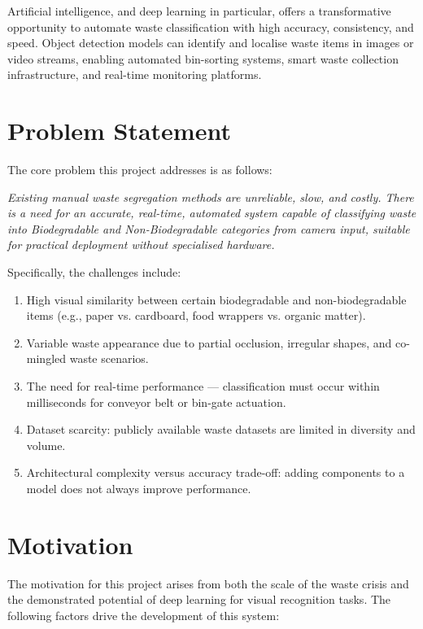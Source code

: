 Artificial intelligence, and deep learning in particular, offers a transformative opportunity to automate waste classification with high accuracy, consistency, and speed. Object detection models can identify and localise waste items in images or video streams, enabling automated bin-sorting systems, smart waste collection infrastructure, and real-time monitoring platforms.

\section{Problem Statement}

The core problem this project addresses is as follows:

\textit{Existing manual waste segregation methods are unreliable, slow, and costly. There is a need for an accurate, real-time, automated system capable of classifying waste into Biodegradable and Non-Biodegradable categories from camera input, suitable for practical deployment without specialised hardware.}

Specifically, the challenges include:
\begin{enumerate}
    \item High visual similarity between certain biodegradable and non-biodegradable items (e.g., paper vs. cardboard, food wrappers vs. organic matter).
    \item Variable waste appearance due to partial occlusion, irregular shapes, and co-mingled waste scenarios.
    \item The need for real-time performance — classification must occur within milliseconds for conveyor belt or bin-gate actuation.
    \item Dataset scarcity: publicly available waste datasets are limited in diversity and volume.
    \item Architectural complexity versus accuracy trade-off: adding components to a model does not always improve performance.
\end{enumerate}

\section{Motivation}

The motivation for this project arises from both the scale of the waste crisis and the demonstrated potential of deep learning for visual recognition tasks. The following factors drive the development of this system:

